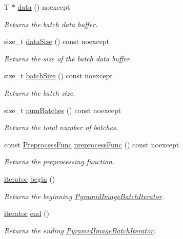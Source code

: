 \begin{DoxyCompactItemize}
T $\ast$ \hyperlink{group___imagery_module_ga5ac82c16d79194885581fc6cb07f7f41}{data} () noexcept
\begin{DoxyCompactList}\small\item\em Returns the batch data buffer. \end{DoxyCompactList}\item 
size\+\_\+t \hyperlink{group___imagery_module_gae52827a6e33495ed3b41bc8fa9e956aa}{data\+Size} () const noexcept
\begin{DoxyCompactList}\small\item\em Returns the size of the batch data buffer. \end{DoxyCompactList}\item 
size\+\_\+t \hyperlink{group___imagery_module_gac5041040cb2396c35286067a6be232bc}{batch\+Size} () const noexcept
\begin{DoxyCompactList}\small\item\em Returns the batch size. \end{DoxyCompactList}\item 
size\+\_\+t \hyperlink{group___imagery_module_gadda0749e3c2b759418c8d148858198a9}{num\+Batches} () const noexcept
\begin{DoxyCompactList}\small\item\em Returns the total number of batches. \end{DoxyCompactList}\item 
const \hyperlink{namespacedg_1_1deepcore_1_1imagery_ad59888e5453be057c25213ce51df1439}{Preprocess\+Func} \hyperlink{group___imagery_module_gaf8e7737e6e0119039d2d755781450508}{preprocess\+Func} () const noexcept
\begin{DoxyCompactList}\small\item\em Returns the preprocessing function. \end{DoxyCompactList}\item 
\hyperlink{classdg_1_1deepcore_1_1imagery_1_1_pyramid_image_batch_a4cad1aac53a144da29324e48ea357f78}{iterator} \hyperlink{group___imagery_module_ga536737967e4276b646aadc432cce9ca3}{begin} ()
\begin{DoxyCompactList}\small\item\em Returns the beginning \hyperlink{classdg_1_1deepcore_1_1imagery_1_1_pyramid_image_batch_iterator}{Pyramid\+Image\+Batch\+Iterator}. \end{DoxyCompactList}\item 
\hyperlink{classdg_1_1deepcore_1_1imagery_1_1_pyramid_image_batch_a4cad1aac53a144da29324e48ea357f78}{iterator} \hyperlink{group___imagery_module_ga7e2fa7f2608bc1784f52c8f165fcc2f7}{end} ()
\begin{DoxyCompactList}\small\item\em Returns the ending \hyperlink{classdg_1_1deepcore_1_1imagery_1_1_pyramid_image_batch_iterator}{Pyramid\+Image\+Batch\+Iterator}. \end{DoxyCompactList}\end{DoxyCompactItemize}


